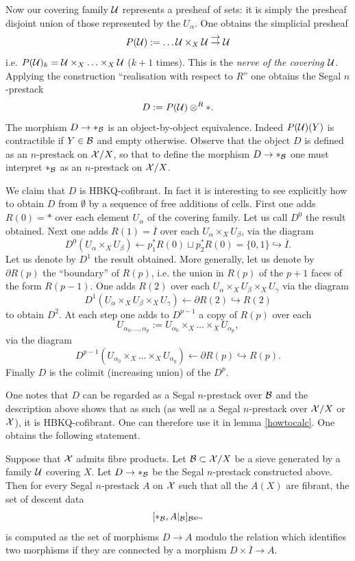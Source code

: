 Now our covering family ${\cal U}$ represents a presheaf of sets: it is simply the
presheaf disjoint union of those represented by the $U_{\alpha}$. One obtains
the simplicial presheaf
$$
P({\cal U} ):= \ldots {\cal U} \times _X {\cal U} \stackrel{\displaystyle \rightarrow}{\rightarrow} {\cal U}
$$
i.e. $P({\cal U} )_k={\cal U} \times _X \ldots \times _X{\cal U} $ ($k+1$ times). This is the
\emph{nerve of the covering ${\cal U}$}. Applying the construction ``realisation
with respect to $R$'' one obtains the Segal $n$-prestack
$$
D:= P({\cal U} )\otimes ^R \ast .
$$
The morphism $D\rightarrow \ast _{{\cal B}}$ is an object-by-object equivalence.
Indeed $P({\cal U} )(Y)$ is contractible if $Y\in {\cal B}$ and empty otherwise. Observe
that the object $D$ is defined as an $n$-prestack on ${\cal X} /X$, so that to
define the morphism $D\rightarrow \ast _{{\cal B}}$ one must interpret
$\ast _{{\cal B}}$ as an $n$-prestack on ${\cal X} /X$.

We claim that $D$ is HBKQ-cofibrant. In fact it is interesting to see
explicitly how to obtain $D$ from $\emptyset$ by a sequence of free additions
of cells. First one adds $R(0)=\ast$ over each element $U_{\alpha}$ of the
covering family. Let us call $D^0$ the result obtained. Next one adds
$R(1)=\overline{I}$ over each $U_{\alpha} \times _XU_{\beta}$, via the diagram
$$
D^0(U_{\alpha} \times _XU_{\beta}) \leftarrow p_1^{\ast}R(0)\sqcup
p_2^{\ast}R(0) = \{ 0,1\} \hookrightarrow \overline{I}.
$$
Let us denote by $D^1$ the result obtained. More generally, let us denote by
$\partial R(p)$ the ``boundary'' of $R(p)$, i.e. the union in $R(p)$ of the
$p+1$ faces of the form $R(p-1)$. One adds $R(2)$ over each
$U_{\alpha}\times _XU_{\beta} \times _XU_{\gamma}$ via the diagram
$$
D^1(U_{\alpha}\times _XU_{\beta}
\times _XU_{\gamma})\leftarrow \partial R(2) \hookrightarrow  R(2)
$$
to obtain $D^2$. At each step one adds to $D^{p-1}$ a copy of $R(p)$ over each
$$
U_{\alpha _0,\ldots , \alpha _p}:=U_{\alpha _0}
\times _X\ldots \times _X U_{\alpha_p},
$$
via the diagram
$$
D^{p-1}(U_{\alpha _0} \times _X\ldots \times _X
U_{\alpha_p})\leftarrow \partial R(p) \hookrightarrow  R(p).
$$
Finally $D$ is the colimit (increasing union) of the $D^p$.

One notes that $D$ can be regarded as a Segal $n$-prestack over ${\cal B}$ and the
description above shows that as such (as well as a Segal $n$-prestack over
${\cal X} /X$ or ${\cal X}$), it is HBKQ-cofibrant. One can therefore use it in lemma
\ref{howtocalc}. One obtains the following statement.

\begin{lemma}
\label{calcdonnees}
Suppose that ${\cal X}$ admits fibre products.
Let ${\cal B} \subset {\cal X} /X$ be a sieve generated by a family ${\cal U}$ covering $X$.
Let $D\rightarrow \ast _{{\cal B}}$ be the Segal $n$-prestack constructed above.
Then for every Segal $n$-prestack $A$ on ${\cal X}$ such that all the $A(X)$ are
fibrant, the set of descent data
$$
[\ast _{{\cal B}}, A|_{{\cal B}}]_{{\cal B} ^{\rm gro}}
$$
is computed as the set of morphisms $D\rightarrow A$ modulo the relation
which identifies two morphisms if they are connected by a morphism
$D\times \overline{I}\rightarrow A$.
\end{lemma}
\eop

